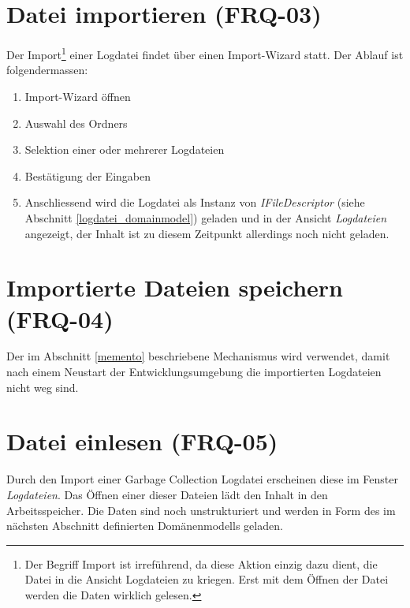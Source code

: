\section{Datei importieren (FRQ-03)}
Der Import\footnote{Der Begriff Import ist irreführend, da diese Aktion einzig dazu dient, die Datei in die Ansicht Logdateien zu kriegen. Erst mit dem Öffnen der Datei werden die Daten wirklich gelesen.} einer Logdatei findet über einen Import-Wizard statt. Der Ablauf ist folgendermassen:
\begin{enumerate}
	\item Import-Wizard öffnen
	\item Auswahl des Ordners
	\item Selektion einer oder mehrerer Logdateien
	\item Bestätigung der Eingaben
	\item Anschliessend wird die Logdatei als Instanz von \textit{IFileDescriptor} (siehe Abschnitt \ref{logdatei_domainmodel}) geladen und in der Ansicht \textit{Logdateien} angezeigt, der Inhalt ist zu diesem Zeitpunkt allerdings noch nicht geladen.
\end{enumerate}

\section{Importierte Dateien speichern (FRQ-04)}
Der im Abschnitt \ref{memento} beschriebene Mechanismus wird verwendet, damit nach einem Neustart der Entwicklungsumgebung die importierten Logdateien nicht weg sind. 

\section{Datei einlesen (FRQ-05)}
Durch den Import einer Garbage Collection Logdatei erscheinen diese im Fenster \textit{Logdateien}. Das Öffnen einer dieser Dateien lädt den Inhalt in den Arbeitsspeicher. Die Daten sind noch unstrukturiert und werden in Form des im nächsten Abschnitt definierten Domänenmodells geladen.

